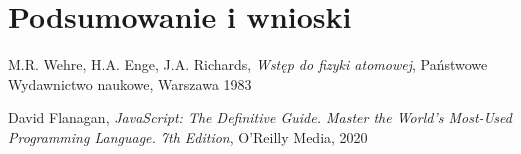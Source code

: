 \documentclass{SGGW-thesis}
\begin{document}
\chapter{Podsumowanie i wnioski}


\begin{thebibliography}{9}
	M.R. Wehre, H.A. Enge, J.A. Richards,
	\textit{Wstęp do fizyki atomowej}, 
	Państwowe Wydawnictwo naukowe, Warszawa 1983
	
	David Flanagan, 
	\textit{JavaScript: The Definitive Guide. Master the World's Most-Used Programming Language. 7th Edition}, 
	O'Reilly Media, 2020
	
	
\end{thebibliography}

\beforelastpage
\end{document}
